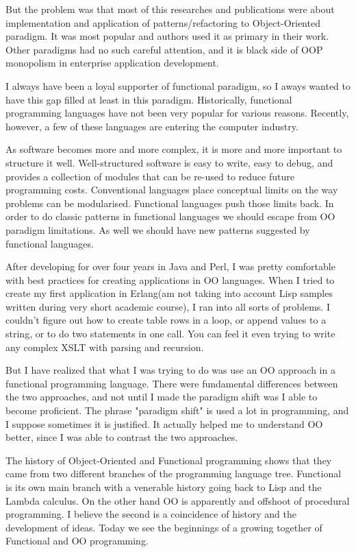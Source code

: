 But the problem was that most of this researches and publications were about implementation and application of patterns/refactoring to Object-Oriented paradigm. It was most popular and authors used it as primary in their work. Other paradigms had no such careful attention, and it is black side of OOP monopolism in enterprise application development.

I always have been a loyal supporter of functional paradigm, so I aways wanted to have this gap filled at least in this paradigm.
Historically, functional programming languages have not been very popular for various reasons. Recently, however, a few of these languages are entering the computer industry. 

As software becomes more and more complex, it is more and more important to structure it well. Well-structured software is easy to write, easy to debug, and provides a collection of modules that can be re-used to reduce future programming costs. Conventional languages place conceptual limits on the way problems can be modularised. Functional languages push those limits back.
In order to do classic patterns in functional languages we should escape from OO paradigm limitations. As well we should have new patterns suggested by functional languages.

After developing for over four years in Java and Perl, I was pretty comfortable with best practices for creating applications in OO languages.
When I tried to create my first application in Erlang(am not taking into account Lisp samples written during very short academic course), I ran into all sorts of problems. I couldn't figure out how to create table rows in a loop, or append values to a string, or to do two statements in one call. You can feel it even trying to write any complex XSLT with parsing and recursion. 

But I have realized that what I was trying to do was use an OO approach in a functional programming language. There were fundamental differences between the two approaches, and not until I made the paradigm shift was I able to become proficient. The phrase "paradigm shift" is used a lot in programming, and I suppose sometimes it is justified. It actually helped me to understand OO better, since I was able to contrast the two approaches.

The history of Object-Oriented and Functional programming shows that they came from two different branches of the programming language tree. Functional is its own main branch with a venerable history going back to Lisp and the Lambda calculus. On the other hand OO is apparently and offshoot of procedural programming. I believe the second is a coincidence of history and the development of ideas. Today we see the beginnings of a growing together of Functional and OO programming.

